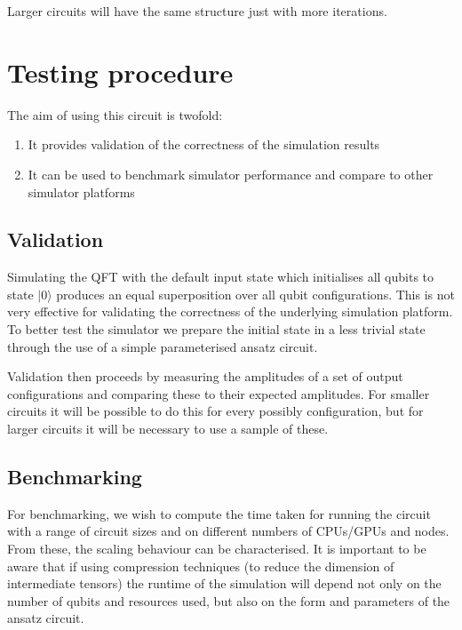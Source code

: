 \documentclass[11pt, a4paper]{article}
\begin{document}
Larger circuits will have the same structure just with more iterations.
 
\section{Testing procedure}
The aim of using this circuit is twofold:

\begin{enumerate}
\item It provides validation of the correctness of the simulation results
\item It can be used to benchmark simulator performance and compare to other simulator platforms
\end{enumerate}

\subsection{Validation}
Simulating the QFT with the default input state which initialises all qubits to state $|0\rangle$ produces an equal superposition over 
all qubit configurations. This is not very effective for validating the correctness of the underlying simulation platform. To better test
the simulator we prepare the initial state in a less trivial state through the use of a simple parameterised ansatz circuit. 


Validation then proceeds by measuring the amplitudes of a set of output configurations and comparing these to their expected amplitudes. For smaller circuits 
it will be possible to do this for every possibly configuration, but for larger circuits it will be necessary to use a sample of these.

\subsection{Benchmarking}
For benchmarking, we wish to compute the time taken for running the circuit with a range of circuit sizes and on different numbers of CPUs/GPUs and nodes. From 
these, the scaling behaviour can be characterised. It is important to be aware that if using compression techniques (to reduce the dimension of intermediate tensors) 
the runtime of the simulation will depend not only on the number of qubits and resources used, but also on the form and parameters of the ansatz circuit.
\end{document}
